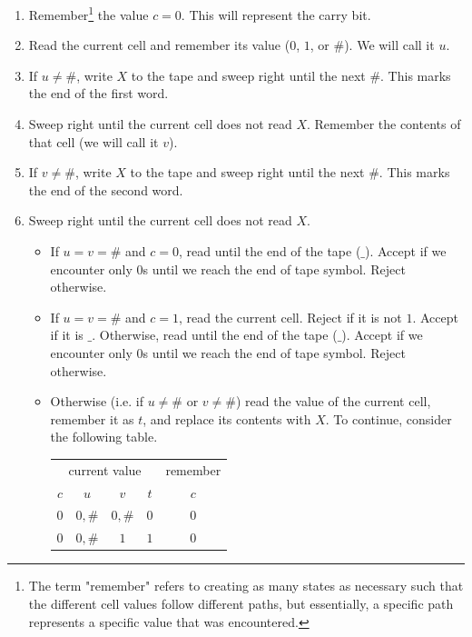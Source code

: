 \begin{enumerate}
    \item Remember\footnote{The term "remember" refers to creating as many states as necessary such that the different cell values follow different paths, but essentially, a specific path represents a specific value that was encountered.} the value $c=0$. This will represent the carry bit.
    \item \label{first_word_next_cell} Read the current cell and remember its value ($0$, $1$, or $\#$). We will call it $u$.
    \item If $u \neq \#$, write $X$ to the tape and sweep right until the next $\#$. This marks the end of the first word. 
    \item Sweep right until the current cell does not read $X$. Remember the contents of that cell (we will call it $v$).
    \item If $v \neq \#$, write $X$ to the tape and sweep right until the next $\#$. This marks the end of the second word.
    \item Sweep right until the current cell does not read $X$.
        \begin{itemize}
            \item
                If $u=v=\#$ and $c=0$, read until the end of the tape ($\_$).
                Accept if we encounter only $0$s until we reach the end of tape symbol.
                Reject otherwise.
            \item
                If $u=v=\#$ and $c=1$, read the current cell.
                Reject if it is not $1$. Accept if it is $\_$.
                Otherwise, read until the end of the tape ($\_$).
                Accept if we encounter only $0$s until we reach the end of tape symbol.
                Reject otherwise.
            \item
                Otherwise (i.e. if $u \neq \#$ or $v \neq \#$) read the value of the current cell, remember it as $t$, and replace its contents with $X$. To continue, consider the following table.
                \begin{center}
                    \begin{tabular}{cccc|c}
                        \multicolumn{4}{c|}{current value} & remember \\
                        $c$ & $u$ & $v$ & $t$ & $c$  \\
                        \hline
                        $0$ & $0,\#$ & $0,\#$ & $0$ & $0$ \\
                        $0$ & $0,\#$ & $1$ & $1$ & $0$ \\

\end{tabular}
\end{center}
\end{itemize}
\end{enumerate}
